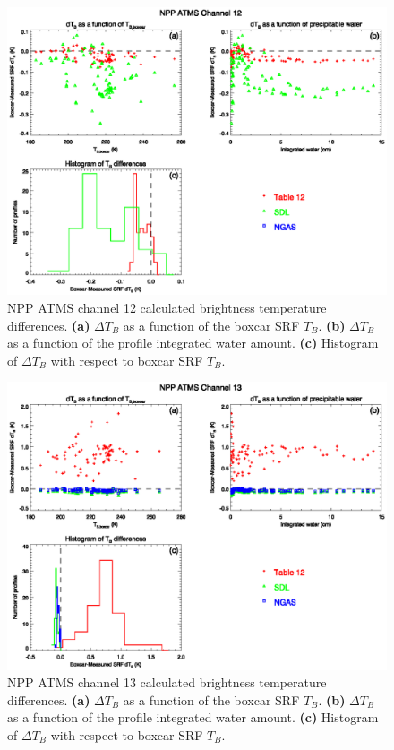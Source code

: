 \begin{figure}[H]
  \centering
  \includegraphics[scale=1]{graphics/dtb/atms_npp.ch12.TbStats.eps}
  \caption{NPP ATMS channel 12 calculated brightness temperature differences. \textbf{(a)} $\Delta T_B$ as a function of the boxcar SRF $T_B$. \textbf{(b)} $\Delta T_B$ as a function of the profile integrated water amount. \textbf{(c)} Histogram of $\Delta T_B$ with respect to boxcar SRF $T_B$.}
  \label{fig:atms_npp.ch12.dtb}
\end{figure}

\begin{figure}[H]
  \centering
  \includegraphics[scale=1]{graphics/dtb/atms_npp.ch13.TbStats.eps}
  \caption{NPP ATMS channel 13 calculated brightness temperature differences. \textbf{(a)} $\Delta T_B$ as a function of the boxcar SRF $T_B$. \textbf{(b)} $\Delta T_B$ as a function of the profile integrated water amount. \textbf{(c)} Histogram of $\Delta T_B$ with respect to boxcar SRF $T_B$.}
  \label{fig:atms_npp.ch13.dtb}
\end{figure}

